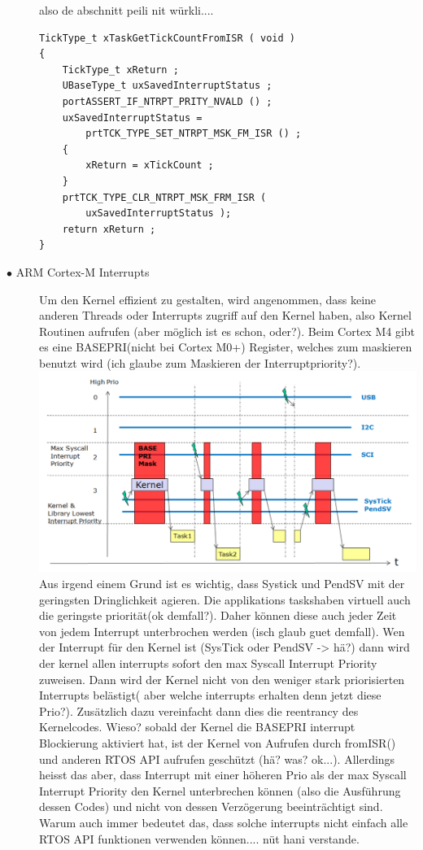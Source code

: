 \documentclass[a4paper, 8pt]{extarticle}
\begin{document}
\begin{multicols*}{3}
\begin{description}
							also de abschnitt peili nit würkli....
							\begin{lstlisting}
TickType_t xTaskGetTickCountFromISR ( void )
{
	TickType_t xReturn ;
	UBaseType_t uxSavedInterruptStatus ;
	portASSERT_IF_NTRPT_PRITY_NVALD () ;
	uxSavedInterruptStatus =
		prtTCK_TYPE_SET_NTRPT_MSK_FM_ISR () ;		
	{
		xReturn = xTickCount ;
	}
	prtTCK_TYPE_CLR_NTRPT_MSK_FRM_ISR (
		uxSavedInterruptStatus );
	return xReturn ;
}
							\end{lstlisting} 
					\item[$\bullet$ ARM Cortex-M Interrupts]
							Um den Kernel effizient zu gestalten, wird angenommen, dass keine anderen Threads oder Interrupts zugriff auf den Kernel
							haben, also Kernel Routinen aufrufen (aber möglich ist es schon, oder?). Beim Cortex M4 gibt es eine BASEPRI(nicht bei Cortex M0+) Register, welches
							zum maskieren benutzt wird (ich glaube zum Maskieren der Interruptpriority?).
							\includegraphics[width=0.6\linewidth,left]{img/ARM_Interrupt_Priorities.PNG}
							Aus irgend einem Grund ist es wichtig, dass Systick und PendSV mit der geringsten Dringlichkeit agieren. Die applikations taskshaben virtuell
							auch die geringste priorität(ok demfall?). Daher können diese auch jeder Zeit von jedem Interrupt unterbrochen werden (isch glaub guet demfall).
							Wen der Interrupt für den Kernel ist (SysTick oder PendSV -> hä?) dann wird der kernel allen interrupts sofort den max Syscall Interrupt Priority zuweisen.
							Dann wird der Kernel nicht von den weniger stark priorisierten Interrupts belästigt( aber welche interrupts erhalten denn jetzt diese Prio?). Zusätzlich dazu 
							vereinfacht dann dies die reentrancy des Kernelcodes. Wieso? sobald der Kernel die BASEPRI interrupt Blockierung aktiviert hat,  ist der Kernel von Aufrufen durch fromISR()
							und anderen RTOS API aufrufen geschützt (hä? was? ok...). Allerdings heisst das aber, dass Interrupt mit einer höheren Prio als der max Syscall Interrupt Priority den Kernel 
							unterbrechen können (also die Ausführung dessen Codes) und nicht von dessen Verzögerung beeinträchtigt sind. Warum auch immer bedeutet das, dass solche interrupts nicht  
							einfach alle RTOS API funktionen verwenden können.... nüt hani verstande.
				\end{description}

\end{multicols*}
\end{document}
